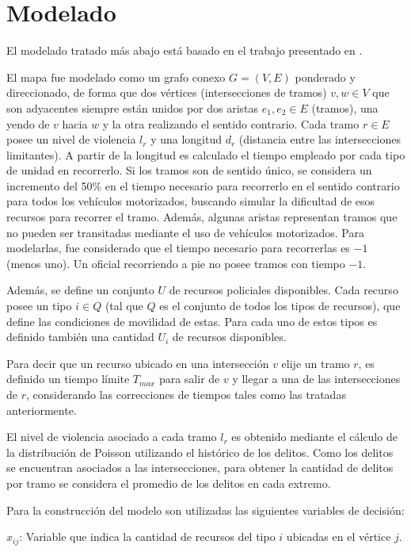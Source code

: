 \section{Modelado}
El modelado tratado más abajo está basado en el trabajo presentado en \cite{7359471}.

El mapa fue modelado como un grafo conexo $G = (V, E)$ ponderado y direccionado, de forma que dos vértices (intersecciones de tramos) $v, w \in V$ que son adyacentes siempre están unidos por dos aristas $e_{1}, e_{2} \in E$ (tramos), una yendo de $v$ hacia $w$ y la otra realizando el sentido contrario. Cada tramo $r \in E$ posee un nivel de violencia $l_{r}$ y una longitud $d_{r}$ (distancia entre las intersecciones limitantes)\cite{van2010introduction}. A partir de la longitud es calculado el tiempo empleado por cada tipo de unidad en recorrerlo. Si los tramos son de sentido único, se considera un incremento del 50\% en el tiempo necesario para recorrerlo en el sentido contrario para todos los vehículos motorizados, buscando simular la dificultad de esos recursos para recorrer el tramo. Además, algunas aristas representan tramos que no pueden ser transitadas mediante el uso de vehículos motorizados. Para modelarlas, fue considerado que el tiempo necesario para recorrerlas es $-1$ (menos uno). Un oficial recorriendo a pie no posee tramos con tiempo $-1$.

Además, se define un conjunto $U$ de recursos policiales disponibles. Cada recurso posee un tipo $i \in Q$ (tal que $Q$ es el conjunto de todos los tipos de recursos), que define las condiciones de movilidad de estas. Para cada uno de estos tipos es definido también una cantidad $U_{i}$ de recursos disponibles.

Para decir que un recurso ubicado en una intersección $v$ elije un tramo $r$, es definido un tiempo límite $T_{max}$ para salir de $v$ y llegar a una de las intersecciones de $r$, considerando las correcciones de tiempos tales como las tratadas anteriormente.

El nivel de violencia asociado a cada tramo $l_{r}$ es obtenido mediante el cálculo de la distribución de Poisson\cite{moreno1995manual} utilizando el histórico de los delitos. Como los delitos se encuentran asociados a las intersecciones, para obtener la cantidad de delitos por tramo se considera el promedio de los delitos en cada extremo.

Para la construcción del modelo son utilizadas las siguientes variables de decisión:

$x_{ij}$: Variable que indica la cantidad de recursos del tipo $i$ ubicadas en el vértice $j$.

